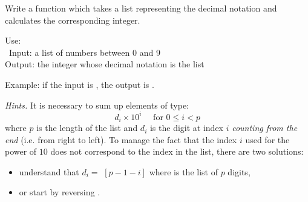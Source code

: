 \documentclass[11pt,class=report,crop=false]{standalone}
\begin{document}


\begin{activite}


Write a  function which takes a list representing the decimal notation and calculates the corresponding integer.
  
  \begin{fonction}
  Use:  \\\
  Input: a list of numbers between $0$ and $9$ \\
  Output: the integer whose decimal notation is the list
  
  \medskip
  Example: if the input is \ci{[1,2,3,4]}, the output is .
  \end{fonction} 
  
  \emph{Hints.}  It is necessary to sum up elements of type:
    $$d_i \times 10^{i} \quad \text{ for } 0 \le i < p$$
    where $p$ is the length of the list and $d_i$ is the digit at index $i$ \emph{counting from the end} (i.e. from right to left). To manage the fact that the index $i$ used for the power of $10$ does not correspond to the index in the list, there are two solutions:
  \begin{itemize}
    \item understand that $d_i = $ $[p-1-i]$ where  is the list of $p$ digits,
    \item or start by reversing \ci{mylist}.    
   \end{itemize}  
  
\end{activite}

\end{document}
